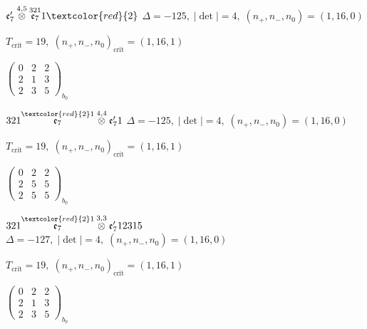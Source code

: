 \documentclass[10pt]{article}
\begin{document}
\smallskip

$\mathfrak{e}_7'\overset{4,5}{\otimes}\overset{321}{\mathfrak{e}_7}1\textcolor{red}{2}$ \quad $\Delta=-125,\; |\det|=4,\; (n_+,n_-,n_0)=(1,16,0)$

\hspace{1em}$T_{\text{crit}}=19,\; (n_+,n_-,n_0)_{\text{crit}}=(1,16,1)$

\hspace{2em}$\left(\begin{smallmatrix}0 & 2 & 2 \\ 2 & 1 & 3 \\ 2 & 3 & 5\end{smallmatrix}\right)_{\!b_0}$

\smallskip

$321\overset{\textcolor{red}{2}1}{\mathfrak{e}_7}\overset{4,4}{\otimes}\mathfrak{e}_7'1$ \quad $\Delta=-125,\; |\det|=4,\; (n_+,n_-,n_0)=(1,16,0)$

\hspace{1em}$T_{\text{crit}}=19,\; (n_+,n_-,n_0)_{\text{crit}}=(1,16,1)$

\hspace{2em}$\left(\begin{smallmatrix}0 & 2 & 2 \\ 2 & 5 & 5 \\ 2 & 5 & 5\end{smallmatrix}\right)_{\!b_0}$

\smallskip

$321\overset{\textcolor{red}{2}1}{\mathfrak{e}_7}\overset{3,3}{\otimes}\mathfrak{e}_7'12315$ \quad $\Delta=-127,\; |\det|=4,\; (n_+,n_-,n_0)=(1,16,0)$

\hspace{1em}$T_{\text{crit}}=19,\; (n_+,n_-,n_0)_{\text{crit}}=(1,16,1)$

\hspace{2em}$\left(\begin{smallmatrix}0 & 2 & 2 \\ 2 & 1 & 3 \\ 2 & 3 & 5\end{smallmatrix}\right)_{\!b_0}$

\smallskip
\end{document}
